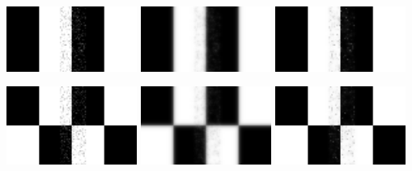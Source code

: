 \documentclass[a4paper,11pt, final]{scrartcl}
\begin{document}
{
\centering 
\includegraphics[width=0.32\textwidth]{ex5_stripes_noise.png}
\includegraphics[width=0.32\textwidth]{ex5_stripes_mrf_gaussian_filtered.png}
\includegraphics[width=0.32\textwidth]{ex5_stripes_mrf_student_filtered.png}
}

{
\centering 
\includegraphics[width=0.32\textwidth]{ex5_checker_noise.png}
\includegraphics[width=0.32\textwidth]{ex5_checker_mrf_gaussian_filtered.png}
\includegraphics[width=0.32\textwidth]{ex5_checker_mrf_student_filtered.png}
}
\end{document}
